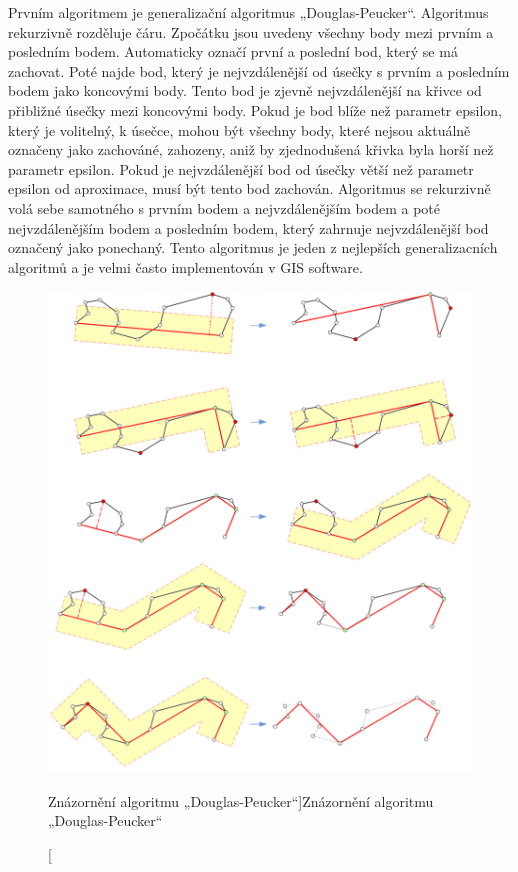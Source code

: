 Prvním algoritmem je generalizační algoritmus „Douglas-Peucker“. Algoritmus rekurzivně rozděluje čáru.
Zpočátku jsou uvedeny všechny body mezi prvním a posledním bodem. Automaticky označí první a poslední bod,
který se má zachovat. Poté najde bod, který je nejvzdálenější od úsečky s prvním a posledním bodem 
jako koncovými body. Tento bod je zjevně nejvzdálenější na křivce od přibližné úsečky mezi koncovými body. 
Pokud je bod blíže než parametr epsilon, který je volitelný, k úsečce, mohou být všechny body, které nejsou aktuálně označeny jako zachováné, 
zahozeny, aniž by zjednodušená křivka byla horší než parametr epsilon. Pokud je nejvzdálenější bod od úsečky větší než parametr epsilon od aproximace,
musí být tento bod zachován. Algoritmus se rekurzivně volá sebe samotného s prvním bodem a nejvzdálenějším bodem 
a poté nejvzdálenějším bodem a posledním bodem, který zahrnuje nejvzdálenější bod označený jako ponechaný. 
Tento algoritmus je jeden z nejlepších generalizacních algoritmů a je velmi často
implementován v GIS software. \cite{bayer-douglas}

\begin{figure}[H] \centering
    \includegraphics[width=400pt]{./pictures/douglas.png}
    \caption[Znázornění algoritmu „Douglas-Peucker“]{Znázornění algoritmu „Douglas-Peucker“ \cite{bayer-douglas}}
	\label{fig:douglas}              
\end{figure} 

